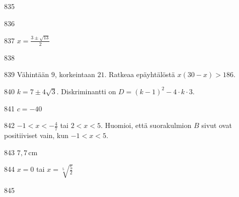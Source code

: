 \begin{Vastaus}{835}
    
\end{Vastaus}
\begin{Vastaus}{836}
    
\end{Vastaus}
\begin{Vastaus}{837}
    $x =\frac{3 \pm \sqrt{13}}{2}$
    
\end{Vastaus}
\begin{Vastaus}{838}
    
\end{Vastaus}
\begin{Vastaus}{839}
	Vähintään $9$, korkeintaan $21$. Ratkeaa epäyhtälöstä $x(30-x)>186$.
	
\end{Vastaus}
\begin{Vastaus}{840}
		$k = 7 \pm 4 \sqrt{3}$. Diskriminantti on $D = (k-1)^2-4\cdot k \cdot 3$.
    
\end{Vastaus}
\begin{Vastaus}{841}
		$c=-40$
    
\end{Vastaus}
\begin{Vastaus}{842}
	$-1 < x < -\frac{4}{7}$ tai $2 < x < 5$. Huomioi, että suorakulmion $B$
    sivut ovat positiiviset vain, kun $-1<x<5$.
    
\end{Vastaus}
\begin{Vastaus}{843}
     $7,7$\,cm
    
\end{Vastaus}
\begin{Vastaus}{844}
		$x=0$ tai $x=\sqrt[5]{\frac{5}{2}}$
    
\end{Vastaus}
\begin{Vastaus}{845}
    
\end{Vastaus}
